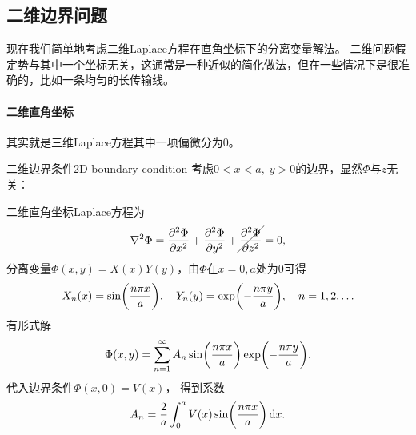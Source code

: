 \subsection{二维边界问题}
\label{ssec:2D boundary problem}

现在我们简单地考虑二维Laplace方程在直角坐标下的分离变量解法。
二维问题假定势与其中一个坐标无关，这通常是一种近似的简化做法，但在一些情况下是很准确的，比如一条均匀的长传输线。

\paragraph{二维直角坐标}

其实就是三维Laplace方程其中一项偏微分为0。

\begin{example}{二维边界条件}{2D boundary condition}
    考虑$0<x<a,\;y>0$的边界，显然$\Phi$与$z$无关：
    \begin{center}
    \end{center}
    二维直角坐标Laplace方程为
    \[
        \lap\Phi=\pv[2]\Phi x+\pv[2]\Phi y+\cancel{\pv[2]\Phi z}=0,
    \]
    分离变量$\Phi(x,y)=X(x)Y(y)$，由$\Phi$在$x=0,a$处为0可得
    \[
        X_n(x)=\sin\biggkh{\frac{n\pi x}a},\quad Y_n(y)=\exp\biggkh{-\frac{n\pi y}a},\quad n=1,2,\ldots
    \]
    有形式解
    \begin{equation}
        \Phi(x,y)=\sum_{n=1}^\infty A_n\sin\biggkh{\frac{n\pi x}a}\exp\biggkh{-\frac{n\pi y}a}.
    \end{equation}
    代入边界条件$\Phi(x,0)=V(x)$，
    得到系数
    \[
        A_n=\frac2a\int_0^aV(x)\sin\biggkh{\frac{n\pi x}a}\d x.
    \]
\end{example}
